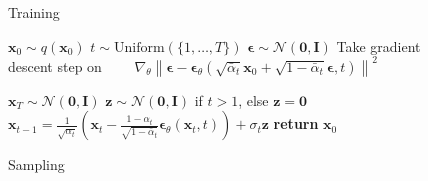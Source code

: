 \documentclass{article}
\newcommand{\grad}{\nabla}
\newcommand{\bI}{\mathbf{I}}
\newcommand{\bzero}{\mathbf{0}}
\newcommand{\bx}{\mathbf{x}}
\newcommand{\bz}{\mathbf{z}}
\newcommand{\bepsilon}{{\boldsymbol{\epsilon}}}
\begin{document}
\algrenewcommand\algorithmicindent{0.5em}%
\begin{figure}[t]
\begin{minipage}[t]{0.495\textwidth}
\begin{algorithm}[H]
  \caption{Training} \label{alg:training}
  \small
  \begin{algorithmic}[1]
    \Repeat
      \State $\bx_0 \sim q(\bx_0)$
      \State $t \sim \mathrm{Uniform}(\{1, \dotsc, T\})$
      \State $\bepsilon\sim\mathcal{N}(\bzero,\bI)$
      \State Take gradient descent step on
      \Statex $\qquad \grad_\theta \left\| \bepsilon - \bepsilon_\theta(\sqrt{\bar\alpha_t} \bx_0 + \sqrt{1-\bar\alpha_t}\bepsilon, t) \right\|^2$
  \end{algorithmic}
\end{algorithm}
\end{minipage}
\hfill
\begin{minipage}[t]{0.495\textwidth}
\begin{algorithm}[H]
  \caption{Sampling} \label{alg:sampling}
  \small
  \begin{algorithmic}[1]
    \vspace{.04in}
    \State $\bx_T \sim \mathcal{N}(\bzero, \bI)$
      \State $\bz \sim \mathcal{N}(\bzero, \bI)$ if $t > 1$, else $\bz = \bzero$
      \State $\bx_{t-1} = \frac{1}{\sqrt{\alpha_t}}\left( \bx_t - \frac{1-\alpha_t}{\sqrt{1-\bar\alpha_t}} \bepsilon_\theta(\bx_t, t) \right) + \sigma_t \bz$
    \EndFor
    \State \textbf{return} $\bx_0$
    \vspace{.04in}
  \end{algorithmic}
\end{algorithm}
\end{minipage}
\vspace{-1em}
\end{figure}
\end{document}
